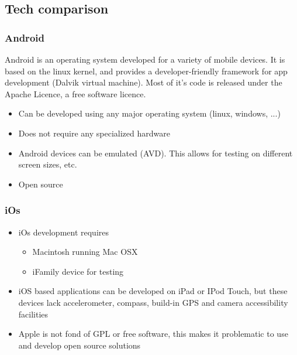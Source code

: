 \subsection{Tech comparison}

\subsubsection{Android}

	Android is an operating system developed for a variety of mobile devices.
	It is based on the linux kernel, and provides a developer-friendly framework
	for app development (Dalvik virtual machine). Most of it's code is released
	under the Apache Licence, a free software licence.

	\begin{itemize}
		\item Can be developed using any major operating system (linux, windows, ...)
		\item Does not require any specialized hardware
		\item Android devices can be emulated (AVD). This allows for testing on
		different screen sizes, etc.
		\item Open source
	\end{itemize}

\subsubsection{iOs}

	\begin{itemize}
		\item iOs development requires
			\begin{itemize}
				\item Macintosh running Mac OSX
				\item iFamily device for testing
			\end{itemize}
		\item iOS based applications can be developed on iPad or IPod Touch, but
		these devices lack accelerometer, compass, build-in GPS and camera
		accessibility facilities
		\item Apple is not fond of GPL or free software, this makes it
		problematic to use and develop open source solutions 
	\end{itemize}



